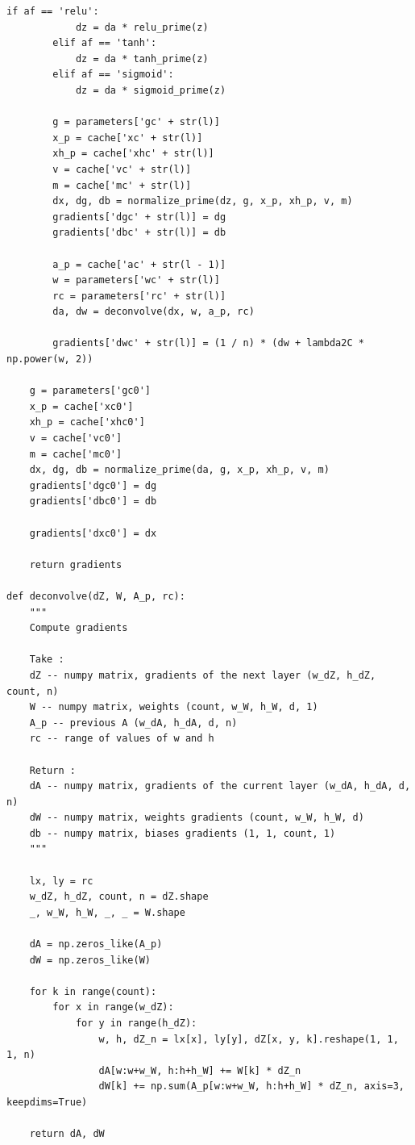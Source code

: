 \documentclass[12pt,a4paper]{extarticle}
\begin{document}
\begin{lstlisting}[mathescape]
        if af == 'relu':
            dz = da * relu_prime(z)
        elif af == 'tanh':
            dz = da * tanh_prime(z)
        elif af == 'sigmoid':
            dz = da * sigmoid_prime(z)

        g = parameters['gc' + str(l)]
        x_p = cache['xc' + str(l)]
        xh_p = cache['xhc' + str(l)]
        v = cache['vc' + str(l)]
        m = cache['mc' + str(l)]
        dx, dg, db = normalize_prime(dz, g, x_p, xh_p, v, m)
        gradients['dgc' + str(l)] = dg
        gradients['dbc' + str(l)] = db

        a_p = cache['ac' + str(l - 1)]
        w = parameters['wc' + str(l)]
        rc = parameters['rc' + str(l)]
        da, dw = deconvolve(dx, w, a_p, rc)

        gradients['dwc' + str(l)] = (1 / n) * (dw + lambda2C * np.power(w, 2))

    g = parameters['gc0']
    x_p = cache['xc0']
    xh_p = cache['xhc0']
    v = cache['vc0']
    m = cache['mc0']
    dx, dg, db = normalize_prime(da, g, x_p, xh_p, v, m)
    gradients['dgc0'] = dg
    gradients['dbc0'] = db

    gradients['dxc0'] = dx

    return gradients
    
def deconvolve(dZ, W, A_p, rc):
    """
    Compute gradients

    Take :
    dZ -- numpy matrix, gradients of the next layer (w_dZ, h_dZ, count, n)
    W -- numpy matrix, weights (count, w_W, h_W, d, 1)
    A_p -- previous A (w_dA, h_dA, d, n)
    rc -- range of values of w and h

    Return :
    dA -- numpy matrix, gradients of the current layer (w_dA, h_dA, d, n)
    dW -- numpy matrix, weights gradients (count, w_W, h_W, d)
    db -- numpy matrix, biases gradients (1, 1, count, 1)
    """

    lx, ly = rc
    w_dZ, h_dZ, count, n = dZ.shape
    _, w_W, h_W, _, _ = W.shape

    dA = np.zeros_like(A_p)
    dW = np.zeros_like(W)

    for k in range(count):
        for x in range(w_dZ):
            for y in range(h_dZ):
                w, h, dZ_n = lx[x], ly[y], dZ[x, y, k].reshape(1, 1, 1, n)
                dA[w:w+w_W, h:h+h_W] += W[k] * dZ_n
                dW[k] += np.sum(A_p[w:w+w_W, h:h+h_W] * dZ_n, axis=3, keepdims=True)

    return dA, dW
\end{lstlisting}
\end{document}
